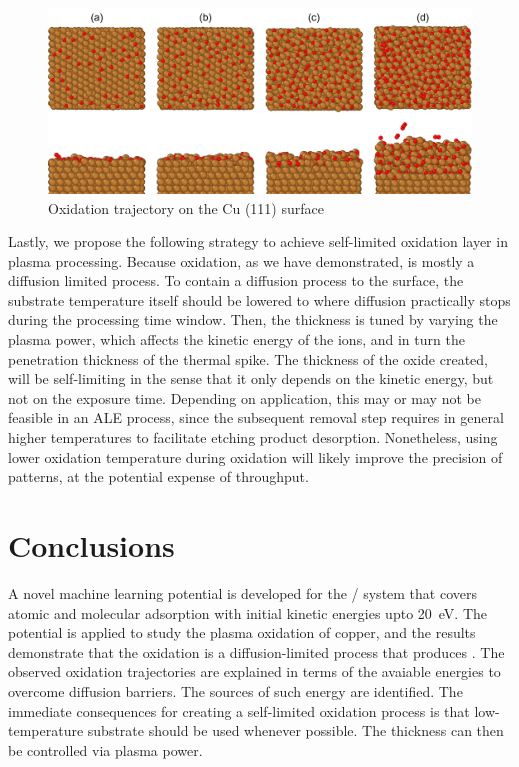 \documentclass[manuscript=cmatex]{achemso}
\begin{document}
\begin{figure}[h]
  \centering
  \includegraphics[width=\textwidth]{traj111}
  \caption[Oxidation trajectory on the Cu (111) surface]{Oxidation trajectory on the Cu (111) surface}
  \label{fig:traj111}
\end{figure}

Lastly, we propose the following strategy to achieve self-limited oxidation layer in plasma processing. Because oxidation, as we have demonstrated, is mostly a diffusion limited process. To contain a diffusion process to the surface, the substrate temperature itself should be lowered to where diffusion practically stops during the processing time window. Then, the thickness is tuned by varying the plasma power, which affects the kinetic energy of the ions, and in turn the penetration thickness of the thermal spike. The thickness of the oxide created, will be self-limiting in the sense that it only depends on the kinetic energy, but not on the exposure time. Depending on application, this may or may not be feasible in an ALE process, since the subsequent removal step requires in general higher temperatures to facilitate etching product desorption. Nonetheless, using lower oxidation temperature during oxidation will likely improve the precision of patterns, at the potential expense of throughput. 

\section{Conclusions}
A novel machine learning potential is developed for the / system that covers atomic and molecular adsorption with initial kinetic energies upto \SI{20}{eV}. The potential is applied to study the plasma oxidation of copper, and the results demonstrate that the oxidation is a diffusion-limited process that produces . The observed oxidation trajectories are explained in terms of the avaiable energies to overcome diffusion barriers. The sources of such energy are identified. The immediate consequences for creating a self-limited oxidation process is that low-temperature substrate should be used whenever possible. The thickness can then be controlled via plasma power. 
\end{document}
